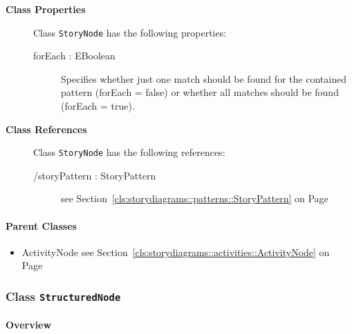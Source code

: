 \begin{description}

	\item[\textbf{Class Properties}] Class \texttt{StoryNode} has the following properties:
	\begin{description}
\item[forEach : EBoolean 	]

\hspace{\fill}
\nopagebreak


	
			
Specifies whether just one match should be found for the contained pattern (forEach  = false) or whether all matches should be found (forEach = true).	
		
	
	\end{description}
	
	\item[\textbf{Class References}] Class \texttt{StoryNode} has the following references:
	\begin{description}
\item[/storyPattern : StoryPattern 	]
see Section~\ref{cls:storydiagrams::patterns::StoryPattern} on Page~\pageref{cls:storydiagrams::patterns::StoryPattern}
\hspace{\fill}
\nopagebreak


	
			
	
		
	
	\end{description}
	

\end{description}

\paragraph{Parent Classes}
\begin{itemize}
\item ActivityNode see Section~\ref{cls:storydiagrams::activities::ActivityNode} on Page~\pageref{cls:storydiagrams::activities::ActivityNode}\end{itemize}
\subsubsection{\Large{Class \bfseries \texttt{StructuredNode}\normalfont}}
\label{cls:storydiagrams::activities::StructuredNode} 
\paragraph{Overview}

